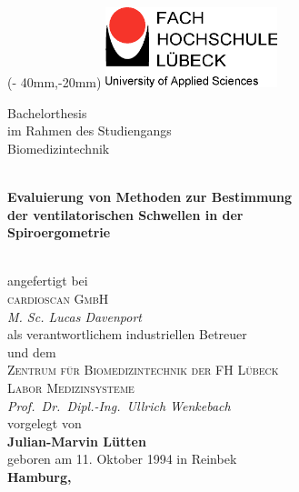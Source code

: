 \begin{titlepage}
\begin{center}

	\begin{textblock*}{50mm}(\textwidth - 40mm,-20mm)
		\includegraphics[width=50mm]{fhl_logo}
	\end{textblock*}
		
		
\vspace*{10mm}
\large {Bachelorthesis\\
im Rahmen des Studiengangs\\
Biomedizintechnik}\\

\vspace{5mm}
\hrulefill\\
\vspace{5mm}

\textbf{\Large%
Evaluierung von Methoden zur Bestimmung\\
der ventilatorischen Schwellen in der\\
Spiroergometrie\\}

\vspace{5mm}
\hrulefill\\
\vspace{5mm}
\large angefertigt bei\\[1.0\baselineskip]
\large \textsc{cardioscan GmbH}\\[0.2\baselineskip]
\large \textsl{M. Sc. Lucas Davenport}\\[0.5\baselineskip]
\large als verantwortlichem industriellen Betreuer\\[1.5\baselineskip]
\large und dem\\[1.5\baselineskip]
\large {\textsc{Zentrum für Biomedizintechnik der FH Lübeck\\
Labor Medizinsysteme}}\\[0.2\baselineskip]
\large {\textsl{Prof.~Dr.~Dipl.-Ing.\ Ullrich Wenkebach}}\\[1.5\baselineskip]
\large vorgelegt von\\[1.5\baselineskip]

\textbf{\Large Julian-Marvin Lütten}\\[0.5\baselineskip]
\large geboren am 11. Oktober 1994 in Reinbek\\[2.0\baselineskip]

\textbf{Hamburg, \mydate}

\end{center}

\end{titlepage}

\cleardoubleemptypage